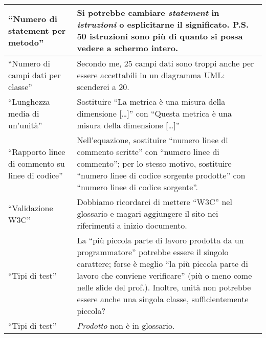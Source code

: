 \documentclass[a4paper]{article}
\begin{document}
\begin{table}
\begin{tabular}{| p{3cm} | p{10cm} |}
	“Numero di statement per metodo” & Si potrebbe cambiare \emph{statement} in \emph{istruzioni} o esplicitarne il significato. P.S. 50 istruzioni sono più di quanto si possa vedere a schermo intero. \\ \hline
	“Numero di campi dati per classe” & Secondo me, 25 campi dati sono troppi anche per essere accettabili in un diagramma UML: scenderei a 20. \\ \hline
	“Lunghezza media di un'unità” & Sostituire “La metrica è una misura della dimensione [\dots]” con “Questa metrica è una misura della dimensione [\dots]” \\ \hline
	“Rapporto linee di commento su linee di codice” & Nell'equazione, sostituire “numero linee di commento scritte” con “numero linee di commento”; per lo stesso motivo, sostituire “numero linee di codice sorgente prodotte” con “numero linee di codice sorgente”. \\ \hline
	“Validazione W3C” & Dobbiamo ricordarci di mettere “W3C” nel glossario e magari aggiungere il sito nei riferimenti a inizio documento. \\ \hline
	“Tipi di test” & La “più piccola parte di lavoro prodotta da un programmatore” potrebbe essere il singolo carattere; forse è meglio “la più piccola parte di lavoro che conviene verificare” (più o meno come nelle slide del prof.). Inoltre, unità non potrebbe essere anche una singola classe, sufficientemente piccola? \\ \hline
	“Tipi di test” & \emph{Prodotto} non è in glossario. \\ \hline
\end{tabular}
\end{table}
\end{document}

